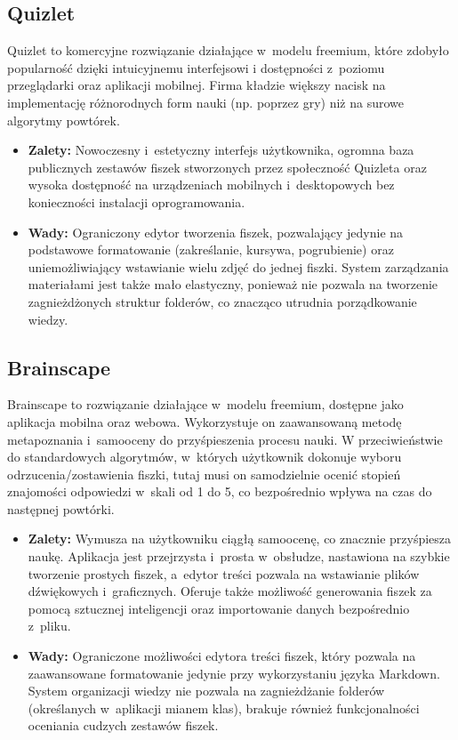 \subsection*{Quizlet}
Quizlet to komercyjne rozwiązanie działające w~modelu freemium, które zdobyło popularność dzięki intuicyjnemu interfejsowi 
i dostępności z~poziomu przeglądarki oraz aplikacji mobilnej. Firma kładzie większy nacisk na implementację różnorodnych 
form nauki (np. poprzez gry) niż na surowe algorytmy powtórek.
\begin{itemize}
    \item \textbf{Zalety:} Nowoczesny i~estetyczny interfejs użytkownika, ogromna baza publicznych zestawów fiszek stworzonych 
    przez społeczność Quizleta oraz wysoka dostępność na urządzeniach mobilnych i~desktopowych bez konieczności instalacji oprogramowania.
    \item \textbf{Wady:} Ograniczony edytor tworzenia fiszek, pozwalający jedynie na podstawowe formatowanie (zakreślanie, kursywa, pogrubienie) oraz 
    uniemożliwiający wstawianie wielu zdjęć do jednej fiszki. System zarządzania materiałami jest także mało elastyczny, ponieważ nie pozwala na 
    tworzenie zagnieżdżonych struktur folderów, co znacząco utrudnia porządkowanie wiedzy.
\end{itemize}

\subsection*{Brainscape}
Brainscape to rozwiązanie działające w~modelu freemium, dostępne jako aplikacja mobilna oraz webowa. Wykorzystuje on zaawansowaną 
metodę metapoznania i~samooceny do przyśpieszenia procesu nauki. 
W przeciwieństwie do standardowych algorytmów, w~których użytkownik dokonuje wyboru odrzucenia/zostawienia fiszki, tutaj musi on 
samodzielnie ocenić stopień znajomości odpowiedzi w~skali od 1 do 5, co bezpośrednio wpływa na czas do następnej powtórki.
\begin{itemize}
    \item \textbf{Zalety:} Wymusza na użytkowniku ciągłą samoocenę, co znacznie przyśpiesza naukę. Aplikacja jest przejrzysta i~prosta w~obsłudze, 
    nastawiona na szybkie tworzenie prostych fiszek, a~edytor treści pozwala na wstawianie plików dźwiękowych i~graficznych. Oferuje także możliwość 
    generowania fiszek za pomocą sztucznej inteligencji oraz importowanie danych bezpośrednio z~pliku. 
    \item \textbf{Wady:} Ograniczone możliwości edytora treści fiszek, który pozwala na zaawansowane formatowanie jedynie przy wykorzystaniu języka 
    Markdown. System organizacji wiedzy nie pozwala na zagnieżdżanie folderów (określanych w~aplikacji mianem klas), brakuje również funkcjonalności 
    oceniania cudzych zestawów fiszek. 
\end{itemize}

